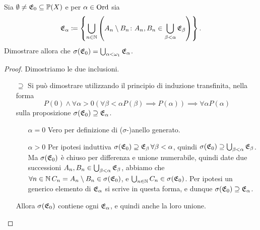 \documentclass[../EserciziIstituzioniAnalisi.tex]{subfiles}
\begin{document}
\begin{exercise}  
  Sia $\emptyset \neq \mathfrak E_0 \subseteq \mathbb P(X)$ e per $\alpha \in \operatorname{Ord}$ sia 
\begin{equation}
  \mathfrak E_{\alpha}\coloneqq \left\{ \bigcup_{n\in \mathbb N} \left(A_n\setminus B_n \colon A_n,B_n \in \bigcup_{\beta<\alpha}\mathfrak E_{\beta}\right)\right\}.
\end{equation}
Dimostrare allora che $\sigma(\mathfrak E_0)=\bigcup_{\alpha<\omega_1}\mathfrak E_{\alpha}$.
\end{exercise}
\begin{proof}
  Dimostriamo le due inclusioni.
  \begin{itemize}
    \item[$\supseteq$] Si può dimostrare utilizzando il principio di induzione transfinita, nella forma
    $$P(0)\land \forall \alpha>0 \left(\forall \beta<\alpha P(\beta) \implies P(\alpha) \right) \implies \forall \alpha P(\alpha)$$
    sulla proposizione $\sigma(\mathfrak E_0)\supseteq\mathfrak E_{\alpha}$.
    \begin{itemize}
      \item[$\alpha=0$] Vero per definizione di ($\sigma$-)anello generato.
      \item[$\alpha>0$] Per ipotesi induttiva $\sigma(\mathfrak E_0)\supseteq\mathfrak E_{\beta}\, \forall \beta<\alpha$, quindi $\sigma(\mathfrak E_0)\supseteq\bigcup_{\beta<\alpha}\mathfrak E_{\beta}$. Ma $\sigma(\mathfrak E_0)$ è chiuso per differenza e unione numerabile, quindi date due successioni $A_n, B_n \in \bigcup_{\beta<\alpha}\mathfrak E_{\beta}$, abbiamo che $\forall n \in \mathbb N\, C_n=A_n\setminus B_n\in \sigma(\mathfrak E_0)$, e $\bigcup_{n\in \mathbb N}C_n \in \sigma(\mathfrak E_0)$. Per ipotesi un generico elemento di $\mathfrak E_{\alpha}$ si scrive in questa forma, e dunque $\sigma(\mathfrak E_0)\supseteq\mathfrak E_{\alpha}$.
    \end{itemize}
    Allora $\sigma(\mathfrak E_0)$ contiene ogni $\mathfrak E_{\alpha}$, e quindi anche la loro unione.
  \end{itemize}
\end{proof}
\end{document}
